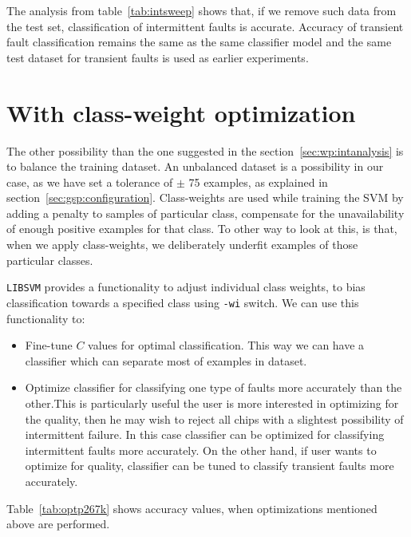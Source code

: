 The analysis from table~\ref{tab:intsweep} shows that, if we remove such data from the test set, classification of intermittent faults is accurate. Accuracy of transient fault classification remains the same as the same classifier model and the same test dataset for transient faults is used as earlier experiments.

\section{With class-weight optimization}
\label{sec:ww}
The other possibility than the one suggested in the section~\ref{sec:wp:intanalysis} is to balance the training dataset. An unbalanced dataset is a possibility in our case, as we have set a tolerance of $\pm$ 75 examples, as explained in section~\ref{sec:gsp:configuration}. Class-weights are used while training the SVM by adding a penalty to samples of particular class, compensate for the unavailability of enough positive examples for that class. To other way to look at this, is that, when we apply class-weights, we deliberately underfit examples of those particular classes.

\texttt{LIBSVM} provides a functionality to adjust individual class weights, to bias classification towards a specified class using \texttt{-wi} switch. We can use this functionality to:
\begin{itemize}
  \item Fine-tune $C$ values for optimal classification. This way we can have a classifier which can separate most of examples in dataset.
  \item Optimize classifier for classifying one type of faults more accurately than the other.This is particularly useful the user is more interested in optimizing for the quality, then he may wish to reject all chips with a slightest possibility of intermittent failure. In this case classifier can be optimized for classifying intermittent faults more accurately. On the other hand, if user wants to optimize for quality, classifier can be tuned to classify transient faults more accurately.
\end{itemize}  

Table~\ref{tab:optp267k} shows accuracy values, when optimizations mentioned above are performed.

